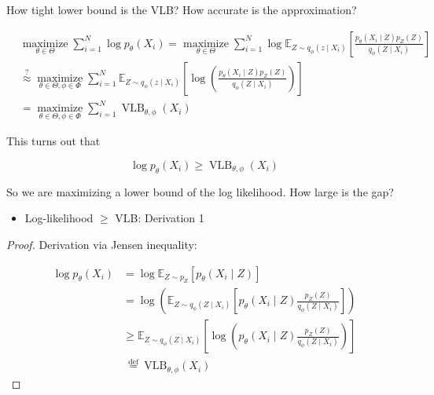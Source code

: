\begin{frame}[allowframebreaks]

\begin{myconceptblock}{11.14}{How tight lower bound is the VLB?}
    How accurate is the approximation?

    $$
    \begin{aligned}
    & \underset{\theta \in \Theta}{\operatorname{maximize}} \sum_{i=1}^{N} \log p_{\theta}\left(X_{i}\right)=\underset{\theta \in \Theta}{\operatorname{maximize}} \sum_{i=1}^{N} \log \mathbb{E}_{Z \sim q_{\phi}\left(z \mid X_{i}\right)}\left[\frac{p_{\theta}\left(X_{i} \mid Z\right) p_{Z}(Z)}{q_{\phi}\left(Z \mid X_{i}\right)}\right] \\
    & \stackrel{?}{\approx} \underset{\theta \in \Theta, \phi \in \Phi}{\operatorname{maximize}} \sum_{i=1}^{N} \mathbb{E}_{Z \sim q_{\phi}\left(z \mid X_{i}\right)}\left[\log \left(\frac{p_{\theta}\left(X_{i} \mid Z\right) p_{Z}(Z)}{q_{\phi}\left(Z \mid X_{i}\right)}\right)\right] \\
    &=\underset{\theta \in \Theta, \phi \in \Phi}{\operatorname{maximize}} \sum_{i=1}^{N} \operatorname{VLB}_{\theta, \phi}\left(X_{i}\right)
    \end{aligned}
    $$

    This turns out that 

    $$
    \log p_{\theta}\left(X_{i}\right) \geq \operatorname{VLB}_{\theta, \phi}\left(X_{i}\right)
    $$

    So we are maximizing a lower bound of the log likelihood. How large is the gap?

    \par\noindent\textcolor{gray}{\hdashrule{\textwidth}{0.4pt}{1pt 2pt}}

    \begin{itemize}
        \item Log-likelihood $\geq$ VLB: Derivation 1
    \end{itemize}

    \begin{proof}
        Derivation via Jensen inequality:

        $$
        \begin{aligned}
        \log p_{\theta}\left(X_{i}\right) & =\log \mathbb{E}_{Z \sim p_{Z}}\left[p_{\theta}\left(X_{i} \mid Z\right)\right] \\
        & =\log \left(\mathbb{E}_{Z \sim q_{\phi}\left(Z \mid X_{i}\right)}\left[p_{\theta}\left(X_{i} \mid Z\right) \frac{p_{Z}(Z)}{q_{\phi}\left(Z \mid X_{i}\right)}\right]\right) \\
        & \geq \mathbb{E}_{Z \sim q_{\phi}\left(Z \mid X_{i}\right)}\left[\log \left(p_{\theta}\left(X_{i} \mid Z\right) \frac{p_{Z}(Z)}{q_{\phi}\left(Z \mid X_{i}\right)}\right)\right] \\
        & \stackrel{\text { def }}{=} \mathrm{VLB}_{\theta, \phi}\left(X_{i}\right)
        \end{aligned}
        $$
    \end{proof}


\end{myconceptblock}
\end{frame}

